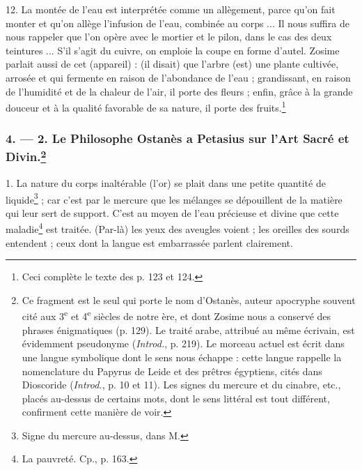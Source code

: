 \documentclass[a4paper, 11pt, oneside, polutonikogreek, french]{article}
\begin{document}
12. La montée de l'eau est interprétée comme un allègement, parce qu'on fait monter et qu'on allège l'infusion de l'eau, combinée au corps ... Il nous suffira de nous rappeler que l'on opère avec le mortier et le pilon, dans le cas des deux teintures ... S'il s'agit du cuivre, on emploie la coupe en forme d'autel. Zosime parlait aussi de cet (appareil) : (il disait) que l'arbre (est) une plante cultivée, arrosée et qui fermente en raison de l'abondance de l'eau ; grandissant, en raison de l'humidité et de la chaleur de l'air, il porte des fleurs ; enfin, grâce à la grande douceur et à la qualité favorable de sa nature, il porte des fruits.\footnote{Ceci complète le texte des p. 123 et 124.}

\bigskip
\centerline{\EightStarTaper}
\centerline{\EightStarTaper\EightStarTaper}
\bigskip

\subsubsection[4. --- 2. Le Philosophe Ostanès a Petasius sur l'Art Sacré et Divin.]{4. --- 2. Le Philosophe Ostanès a Petasius sur l'Art Sacré et Divin.\footnote{Ce fragment est le seul qui porte le nom d'Ostanès, auteur apocryphe souvent cité aux 3\textsuperscript{e} et 4\textsuperscript{e} siècles de notre ère, et dont Zosime nous a conservé des phrases énigmatiques (p. 129). Le traité arabe, attribué au même écrivain, est évidemment pseudonyme (\emph{Introd.}, p. 219). Le morceau actuel est écrit dans une langue symbolique dont le sens nous échappe : cette langue rappelle la nomenclature du Papyrus de Leide et des prêtres égyptiens, cités dans Dioscoride (\emph{Introd.}, p. 10 et 11). Les signes du mercure et du cinabre, etc., placés au-dessus de certains mots, dont le sens littéral est tout différent, confirment cette manière de voir.}}

1. La nature du corps inaltérable (l'or) se plait dans une petite quantité de liquide\footnote{Signe du mercure au-dessus, dans M.} ; car c'est par le mercure que les mélanges se dépouillent de la matière qui leur sert de support. C'est au moyen de l'eau précieuse et divine que cette maladie\footnote{La pauvreté. Cp., p. 163.} est traitée. (Par-là) les yeux des aveugles voient ; les oreilles des sourds entendent ; ceux dont la langue est embarrassée parlent clairement.
\end{document}
